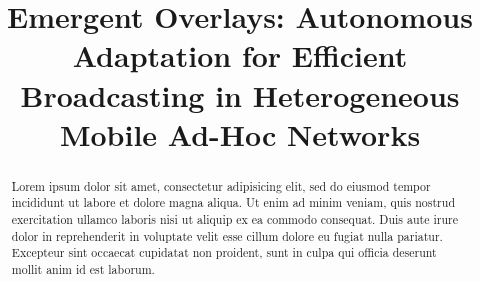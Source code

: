 \documentclass[sigconf]{acmart}
\begin{document}
\title{Emergent Overlays: Autonomous Adaptation for Efficient Broadcasting in Heterogeneous Mobile Ad-Hoc Networks}

%
%
%
%
%
%
%
%

\begin{abstract}
Lorem ipsum dolor sit amet, consectetur adipisicing elit, sed do eiusmod tempor incididunt ut labore et dolore magna aliqua. Ut enim ad minim veniam, quis nostrud exercitation ullamco laboris nisi ut aliquip ex ea commodo consequat. Duis aute irure dolor in reprehenderit in voluptate velit esse cillum dolore eu fugiat nulla pariatur. Excepteur sint occaecat cupidatat non proident, sunt in culpa qui officia deserunt mollit anim id est laborum.
\end{abstract}
\end{document}
